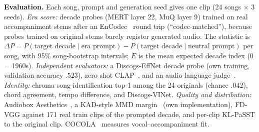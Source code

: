 \documentclass[10pt,twocolumn]{article}
\newcommand{\dP}{\Delta P}
\begin{document}
\textbf{Evaluation.} Each song, prompt and generation seed gives one clip (24 songs $\times$ 3 seeds). \emph{Era score:} decade probes (MERT layer 22, MuQ layer 9) trained on real accompaniment stems after an EnCodec~\cite{defossez2022encodec} round trip (``codec-matched''), because probes trained on original stems barely register generated audio. The statistic is $\dP=P(\text{target decade}\mid\text{era prompt})-P(\text{target decade}\mid\text{neutral prompt})$ per song, with 95\% song-bootstrap intervals; $E$ is the mean expected decade index (0 = 1960s). \emph{Independent evaluators:} a Discogs-EffNet decade probe (own training, validation accuracy $.523$), zero-shot CLAP~\cite{wu2022laionclap}, and an audio-language judge~\cite{chu2024qwen2audio}. \emph{Identity:} chroma song-identification top-1 among the 24 originals (chance $.042$), chord agreement, tempo difference, and Discogs-VINet. \emph{Quality and distribution:} Audiobox Aesthetics~\cite{tjandra2025audiobox}, a KAD-style MMD margin~\cite{chung2025kad} (own implementation), FD-VGG against 171 real train clips of the prompted decade, and per-clip KL-PaSST to the original clip. COCOLA~\cite{ciranni2024cocola} measures vocal--accompaniment fit.

\begin{table}[t]\centering\footnotesize
\setlength{\tabcolsep}{2pt}
\caption{$\dP$ (MERT / MuQ) for the 1960s, 1980s and 2010s prompts; song-identification top-1 (neutral LoRA generations: $.944$). 24 songs $\times$ 3 seeds. The LoRA row is the mean over three adapter training seeds. Intervals include 0 only for the base 1960s cells; the three-branch rows are positive in 20--24 of 24 songs ($p<.001$) at $g_e{=}7,10$.}\label{tab:gen}
\end{table}
\end{document}
